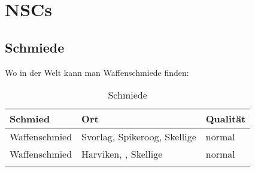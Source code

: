 {\let\clearpage\relax\chapter{NSCs}}

\section{Schmiede}
Wo in der Welt kann man Waffenschmiede finden:
\begin{longtable}{|l|l|l|}
\hline
\textbf{Schmied} & \textbf{Ort} & \textbf{Qualität} \\ \hline

Waffenschmied & Svorlag, Spikeroog, Skellige & normal \\ \hline
Waffenschmied & Harviken, , Skellige & normal \\ \hline


\caption{Schmiede}
\label{tab:Schmiede}
\end{longtable}